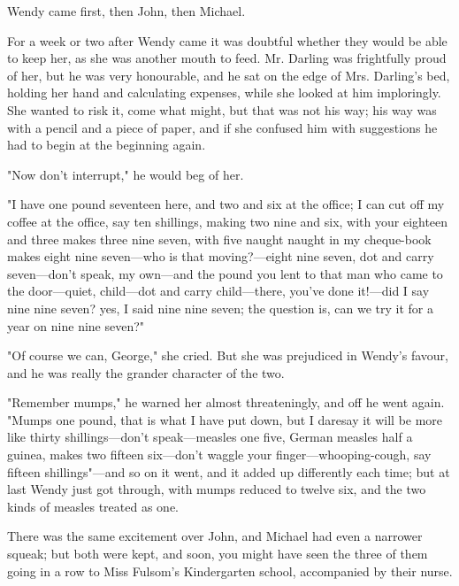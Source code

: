 Wendy came first, then John, then Michael.


For a week or two after Wendy came it was doubtful whether they would be
able to keep her, as she was another mouth to feed. Mr. Darling was
frightfully proud of her, but he was very honourable, and he sat on the
edge of Mrs. Darling's bed, holding her hand and calculating expenses,
while she looked at him imploringly. She wanted to risk it, come what
might, but that was not his way; his way was with a pencil and a piece of
paper, and if she confused him with suggestions he had to begin at the
beginning again.


"Now don't interrupt," he would beg of her.


"I have one pound seventeen here, and two and six at the office; I can cut
off my coffee at the office, say ten shillings, making two nine and six,
with your eighteen and three makes three nine seven, with five naught
naught in my cheque-book makes eight nine seven—who is that moving?—eight
nine seven, dot and carry seven—don't speak, my own—and the
pound you lent to that man who came to the door—quiet, child—dot
and carry child—there, you've done it!—did I say nine nine
seven? yes, I said nine nine seven; the question is, can we try it for a
year on nine nine seven?"


"Of course we can, George," she cried. But she was prejudiced in Wendy's
favour, and he was really the grander character of the two.


"Remember mumps," he warned her almost threateningly, and off he went
again. "Mumps one pound, that is what I have put down, but I daresay it
will be more like thirty shillings—don't speak—measles one
five, German measles half a guinea, makes two fifteen six—don't
waggle your finger—whooping-cough, say fifteen shillings"—and
so on it went, and it added up differently each time; but at last Wendy
just got through, with mumps reduced to twelve six, and the two kinds of
measles treated as one.


There was the same excitement over John, and Michael had even a narrower
squeak; but both were kept, and soon, you might have seen the three of
them going in a row to Miss Fulsom's Kindergarten school, accompanied by
their nurse.


